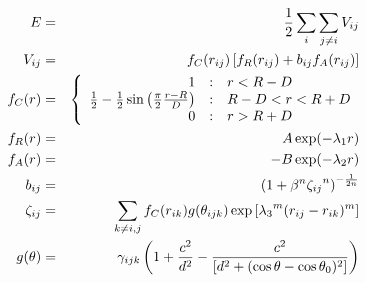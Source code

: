 \documentclass[12pt]{article}
\begin{document}
\begin{eqnarray*}
  E & = & \frac{1}{2} \sum_i \sum_{j \neq i} V_{ij} \\
  V_{ij} & = & f_C(r_{ij}) \left[ f_R(r_{ij}) + b_{ij} f_A(r_{ij}) \right] \\
  f_C(r) & = & \left\{ \begin{array} {r@{\quad:\quad}l}
    1 & r < R - D \\
    \frac{1}{2} - \frac{1}{2} \sin \left( \frac{\pi}{2} \frac{r-R}{D} \right) &
      R-D < r < R + D \\
    0 & r > R + D
    \end{array} \right. \\
  f_R(r) & = & A \exp (-\lambda_1 r) \\
  f_A(r) & = & -B \exp (-\lambda_2 r) \\
  b_{ij} & = & \left( 1 + \beta^n {\zeta_{ij}}^n \right)^{-\frac{1}{2n}} \\
  \zeta_{ij} & = & \sum_{k \neq i,j} f_C(r_{ik}) g(\theta_{ijk})
                   \exp \left[ {\lambda_3}^m (r_{ij} - r_{ik})^m \right] \\
  g(\theta) & = & \gamma_{ijk} \left( 1 + \frac{c^2}{d^2} - 
                  \frac{c^2}{\left[ d^2 + 
		  (\cos \theta - \cos \theta_0)^2\right]} \right)
\end{eqnarray*}                           
\end{document}
